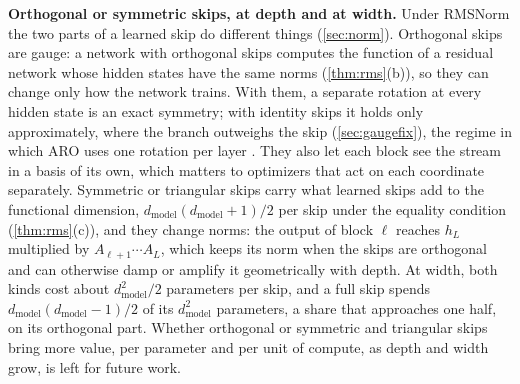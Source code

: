 \documentclass[10pt]{article}
\theoremstyle{definition}
\theoremstyle{remark}
\newcommand{\dm}{d_{\mathrm{model}}}
\newcommand{\para}[1]{\smallskip\noindent\textbf{#1}\hspace{0.5em}}
\begin{document}
\para{Orthogonal or symmetric skips, at depth and at width.} Under RMSNorm the two parts of a learned skip do different things (\cref{sec:norm}). Orthogonal skips are gauge: a network with orthogonal skips computes the function of a residual network whose hidden states have the same norms (\cref{thm:rms}(b)), so they can change only how the network trains. With them, a separate rotation at every hidden state is an exact symmetry; with identity skips it holds only approximately, where the branch outweighs the skip (\cref{sec:gaugefix}), the regime in which ARO uses one rotation per layer \citep[Section~6.4]{gong2026aro}. They also let each block see the stream in a basis of its own, which matters to optimizers that act on each coordinate separately. Symmetric or triangular skips carry what learned skips add to the functional dimension, $\dm(\dm+1)/2$ per skip under the equality condition (\cref{thm:rms}(c)), and they change norms: the output of block $\ell$ reaches $h_L$ multiplied by $A_{\ell+1}\cdots A_L$, which keeps its norm when the skips are orthogonal and can otherwise damp or amplify it geometrically with depth. At width, both kinds cost about $\dm^2/2$ parameters per skip, and a full skip spends $\dm(\dm-1)/2$ of its $\dm^2$ parameters, a share that approaches one half, on its orthogonal part. Whether orthogonal or symmetric and triangular skips bring more value, per parameter and per unit of compute, as depth and width grow, is left for future work.
\end{document}
